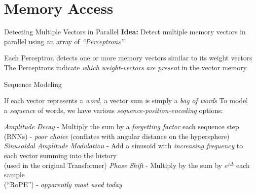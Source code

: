 \section[\sectopts,toc={Processing}]{Memory Access}

\begin{slide}[\slideopts,toc={Perceptrons}]{Detecting Multiple Vectors in Parallel}
\maybepause
\vspace{1em}
\textbf{Idea:} Detect multiple memory vectors in parallel using an array of \emph{``Perceptrons''}
\begin{itemize}
\mpitem Each Perceptron detects one or more memory vectors similar to its weight vectors
\mpitem The Perceptrons indicate \emph{which weight-vectors are present} in the vector memory
\end{itemize}

\end{slide}

\begin{slide}[\slideopts,toc={Sequences}]{Sequence Modeling}
  \vspace{-1em}
  \begin{itemize}
    \mpitem If each vector represents a \emph{word,} a vector sum is simply a \emph{bag of words}
    \mpitem To model a \emph{sequence} of words, we have various \emph{sequence-position-encoding} options:
    \begin{enumerate}
      \mpitem \emph{Amplitude Decay} - Multiply the sum by a \emph{forgetting factor} each sequence step\\
      (RNNs) - \emph{poor choice} (conflates with angular distance on the hypersphere)
      \mpitem \emph{Sinusoidal Amplitude Modulation} - Add a sinusoid with \emph{increasing frequency} to each vector summing into the history\\
      (used in the original Transformer)
      \mpitem \emph{Phase Shift} - Multiply by the sum by $e^{j\Delta}$ each sample\\
      (``RoPE'') - \emph{apparently most used today}
    \end{enumerate}
  \end{itemize}
\end{slide}

